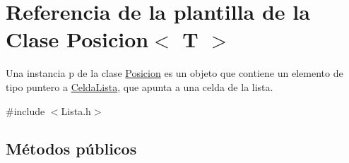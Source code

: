 \hypertarget{classPosicion}{}\section{Referencia de la plantilla de la Clase Posicion$<$ T $>$}
\label{classPosicion}


Una instancia p de la clase \mbox{\hyperlink{classPosicion}{Posicion}} es un objeto que contiene un elemento de tipo puntero a \mbox{\hyperlink{structCeldaLista}{Celda\+Lista}}, que apunta a una celda de la lista.  




{\ttfamily \#include $<$Lista.\+h$>$}

\subsection*{Métodos públicos}
